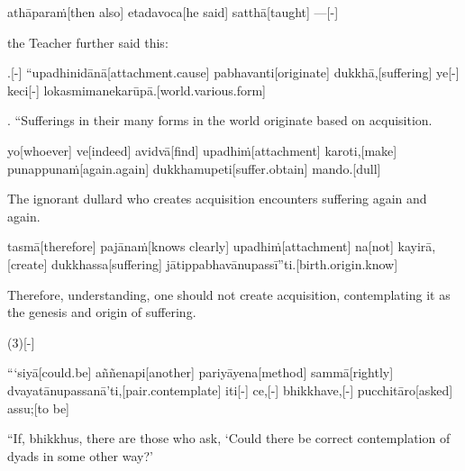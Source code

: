 \begin{samepage}
\begingl[glneveryline={\PaliGlossA,\PaliGlossB}]
athāparaṁ[then also] etadavoca[he said] satthā[taught] —[-]
\endgl
\nopagebreak
\linespread{0.5}
\begin{spacin}{0.2}
{\PaliGlossFT the Teacher further said this:}
\end{spacin}
\vskip 12pt
\end{samepage}
\vskip 0.2in
\begin{samepage}
.[-] “upadhinidānā[attachment.cause] pabhavanti[originate] dukkhā,[suffering] ye[-] keci[-] lokasmimanekarūpā.[world.various.form]
\endgl
\nopagebreak
\linespread{0.5}
\begin{spacin}{0.2}
{. “Sufferings in their many forms in the world originate based on acquisition.}
\end{spacin}
\vskip 12pt
\end{samepage}
\begin{samepage}
\begingl[glneveryline={\PaliGlossA,\PaliGlossB}]
yo[whoever] ve[indeed] avidvā[find] upadhiṁ[attachment] karoti,[make] punappunaṁ[again.again] dukkhamupeti[suffer.obtain] mando.[dull]
\endgl
\nopagebreak
\linespread{0.5}
\begin{spacin}{0.2}
{\PaliGlossFT The ignorant dullard who creates acquisition encounters suffering again and again.}
\end{spacin}
\vskip 12pt
\end{samepage}
\begin{samepage}
\begingl[glneveryline={\PaliGlossA,\PaliGlossB}]
tasmā[therefore] pajānaṁ[knows clearly] upadhiṁ[attachment] na[not] kayirā,[create] dukkhassa[suffering] jātippabhavānupassī”ti.[birth.origin.know]
\endgl
\nopagebreak
\linespread{0.5}
\begin{spacin}{0.2}
{\PaliGlossFT Therefore, understanding, one should not create acquisition, contemplating it as the genesis and origin of suffering.}
\end{spacin}
\vskip 12pt
\end{samepage}
\vskip 0.2in
\begin{samepage}
\begingl[glneveryline={\PaliGlossA,\PaliGlossB}]
(3)[-]
\endgl
\nopagebreak
\linespread{0.5}
\begin{spacin}{0.2}
{\PaliGlossFT [3. Ignorance]}
\end{spacin}
\vskip 12pt
\end{samepage}
\begin{samepage}
\begingl[glneveryline={\PaliGlossA,\PaliGlossB}]
“‘siyā[could.be] aññenapi[another] pariyāyena[method] sammā[rightly] dvayatānupassanā’ti,[pair.contemplate] iti[-] ce,[-] bhikkhave,[-] pucchitāro[asked] assu;[to be]
\endgl
\nopagebreak
\linespread{0.5}
\begin{spacin}{0.2}
{\PaliGlossFT “If, bhikkhus, there are those who ask, ‘Could there be correct contemplation of dyads in some other way?’}
\end{spacin}
\vskip 12pt
\end{samepage}
